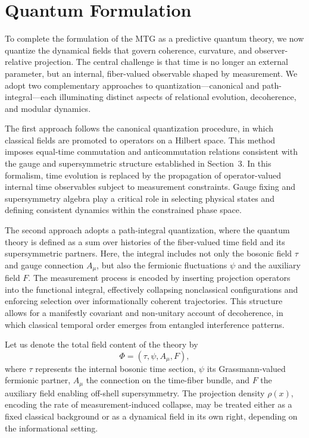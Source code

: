 \documentclass[11pt]{article}
\begin{document}
\section{Quantum Formulation}\label{sec:4}
To complete the formulation of the MTG as a predictive quantum theory, we now quantize the dynamical fields that govern coherence, curvature, and observer-relative projection. The central challenge is that time is no longer an external parameter, but an internal, fiber-valued observable shaped by measurement. We adopt two complementary approaches to quantization—canonical and path-integral—each illuminating distinct aspects of relational evolution, decoherence, and modular dynamics.

The first approach follows the canonical quantization procedure, in which classical fields are promoted to operators on a Hilbert space. This method imposes equal-time commutation and anticommutation relations consistent with the gauge and supersymmetric structure established in Section~3. In this formalism, time evolution is replaced by the propagation of operator-valued internal time observables subject to measurement constraints. Gauge fixing and supersymmetry algebra play a critical role in selecting physical states and defining consistent dynamics within the constrained phase space.

The second approach adopts a path-integral quantization, where the quantum theory is defined as a sum over histories of the fiber-valued time field and its supersymmetric partners. Here, the integral includes not only the bosonic field \( \tau \) and gauge connection \( A_\mu \), but also the fermionic fluctuations \( \psi \) and the auxiliary field \( F \). The measurement process is encoded by inserting projection operators into the functional integral, effectively collapsing nonclassical configurations and enforcing selection over informationally coherent trajectories. This structure allows for a manifestly covariant and non-unitary account of decoherence, in which classical temporal order emerges from entangled interference patterns.

Let us denote the total field content of the theory by
\begin{equation}
\Phi = (\tau, \psi, A_\mu, F),
\end{equation}
where \( \tau \) represents the internal bosonic time section, \( \psi \) its Grassmann-valued fermionic partner, \( A_\mu \) the connection on the time-fiber bundle, and \( F \) the auxiliary field enabling off-shell supersymmetry. The projection density \( \rho(x) \), encoding the rate of measurement-induced collapse, may be treated either as a fixed classical background or as a dynamical field in its own right, depending on the informational setting.
\end{document}
